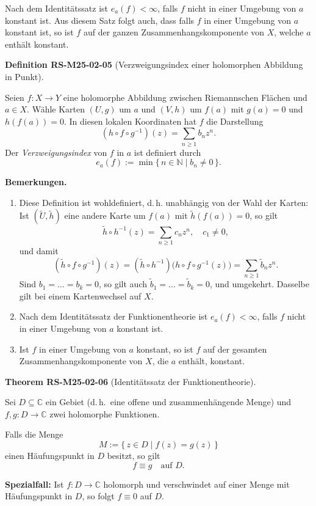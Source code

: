 \documentclass[10pt, letterpaper]{article}
\newcommand{\C}{\mathbb{C}}
\newcommand{\CustomHeading}[3]{%
  \par\medskip\noindent%
  \textbf{#1 #2} \textnormal{(#3)}.\enskip%
}
\newenvironment{DEF}[2]{\begin{unitbox}\CustomHeading{Definition}{#1}{#2}}{\end{unitbox}}
\newenvironment{THEO}[2]{\begin{unitbox}\CustomHeading{Theorem}{#1}{#2}}{\end{unitbox}}
\begin{document}
Nach dem Identitätssatz ist $e_{a}(f)<\infty$, falls $f$ nicht in einer Umgebung von $a$ konstant ist. Aus diesem Satz folgt auch, dass falls $f$ in einer Umgebung von $a$ konstant ist, so ist $f$ auf der ganzen Zusammenhangskomponente von $X$, welche $a$ enthält konstant. 



\begin{DEF}{RS-M25-02-05}{Verzweigungsindex einer holomorphen Abbildung in Punkt}
Seien $f:X\to Y$ eine holomorphe Abbildung zwischen Riemannschen Flächen und $a\in X$.  
Wähle Karten $(U,g)$ um $a$ und $(V,h)$ um $f(a)$ mit $g(a)=0$ und $h(f(a))=0$.  
In diesen lokalen Koordinaten hat $f$ die Darstellung
\[
(h\circ f\circ g^{-1})(z)=\sum_{n\ge1} b_n z^n.
\]
Der \emph{Verzweigungsindex} von $f$ in $a$ ist definiert durch
\[
e_a(f):=\min\{\,n\in\mathbb{N}\mid b_n\neq0\,\}.
\]

\textbf{Bemerkungen.}
\begin{enumerate}
\item Diese Definition ist wohldefiniert, d.\,h. unabhängig von der Wahl der Karten:
Ist $(\widetilde{U},\widetilde{h})$ eine andere Karte um $f(a)$ mit $\widetilde{h}(f(a))=0$, so gilt
\[
\widetilde{h}\circ h^{-1}(z)=\sum_{n\ge1} c_n z^n,\quad c_1\neq0,
\]
und damit
\[
(\widetilde{h}\circ f\circ g^{-1})(z)
=(\widetilde{h}\circ h^{-1})\bigl(h\circ f\circ g^{-1}(z)\bigr)
=\sum_{n\ge1}\widetilde{b}_n z^n.
\]
Sind $b_1=\dots=b_k=0$, so gilt auch $\widetilde{b}_1=\dots=\widetilde{b}_k=0$, und umgekehrt.
Dasselbe gilt bei einem Kartenwechsel auf $X$.

\item Nach dem Identitätssatz der Funktionentheorie ist $e_a(f)<\infty$, falls $f$ nicht in einer Umgebung von $a$ konstant ist.  

\item Ist $f$ in einer Umgebung von $a$ konstant, so ist $f$ auf der gesamten Zusammenhangskomponente von $X$, die $a$ enthält, konstant.
\end{enumerate}
\end{DEF}



\begin{THEO}{RS-M25-02-06}{Identitätssatz der Funktionentheorie}
Sei $D\subseteq\C$ ein Gebiet (d.\,h.\ eine offene und zusammenhängende Menge) und  
$f,g:D\to\C$ zwei holomorphe Funktionen.  

Falls die Menge
\[
M:=\{\,z\in D\mid f(z)=g(z)\,\}
\]
einen Häufungspunkt in $D$ besitzt, so gilt
\[
f\equiv g \quad\text{auf } D.
\]

\textbf{Spezialfall:}
Ist $f:D\to\C$ holomorph und verschwindet auf einer Menge mit Häufungspunkt in $D$, so folgt $f\equiv0$ auf $D$.
\end{THEO}
\end{document}

